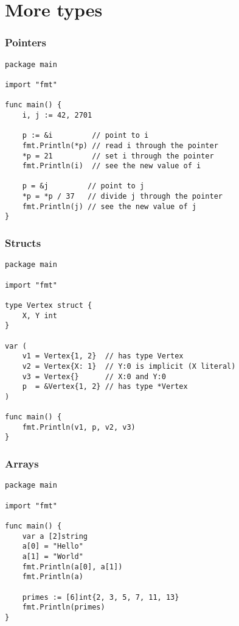 \section{More types}
\begin{frame}[fragile]
\frametitle{Pointers}

\begin{lstlisting}
package main

import "fmt"

func main() {
    i, j := 42, 2701

    p := &i         // point to i
    fmt.Println(*p) // read i through the pointer
    *p = 21         // set i through the pointer
    fmt.Println(i)  // see the new value of i

    p = &j         // point to j
    *p = *p / 37   // divide j through the pointer
    fmt.Println(j) // see the new value of j
}
\end{lstlisting}

\end{frame}


\begin{frame}[fragile]
\frametitle{Structs}

\begin{lstlisting}
package main

import "fmt"

type Vertex struct {
    X, Y int
}

var (
    v1 = Vertex{1, 2}  // has type Vertex
    v2 = Vertex{X: 1}  // Y:0 is implicit (X literal)
    v3 = Vertex{}      // X:0 and Y:0
    p  = &Vertex{1, 2} // has type *Vertex
)

func main() {
    fmt.Println(v1, p, v2, v3)
}
\end{lstlisting}

\end{frame}


\begin{frame}[fragile]
\frametitle{Arrays}

\begin{lstlisting}
package main

import "fmt"

func main() {
    var a [2]string
    a[0] = "Hello"
    a[1] = "World"
    fmt.Println(a[0], a[1])
    fmt.Println(a)

    primes := [6]int{2, 3, 5, 7, 11, 13}
    fmt.Println(primes)
}
\end{lstlisting}

\end{frame}



